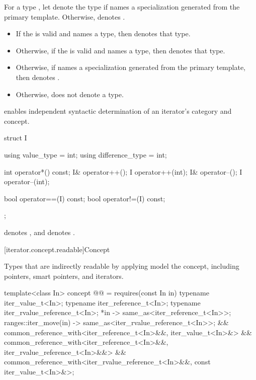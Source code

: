 \pnum
For a type , let  denote
the type  if  names
a specialization generated from the primary template.
Otherwise,  denotes
.
\begin{itemize}
\item If the 
   is valid
  and names a type, then  denotes that
  type.
\item Otherwise, if the 
  is valid and names a type, then 
  denotes that type.
\item Otherwise, if  names a specialization generated
  from the primary template, then 
  denotes .
\item Otherwise,  does not denote a type.
\end{itemize}

\pnum
\begin{note}
 enables independent syntactic determination
of an iterator's category and concept.
\end{note}
\begin{example}
\begin{codeblock}
struct I {
  using value_type = int;
  using difference_type = int;

  int operator*() const;
  I& operator++();
  I operator++(int);
  I& operator--();
  I operator--(int);

  bool operator==(I) const;
  bool operator!=(I) const;
};
\end{codeblock}
 denotes ,
and  denotes .
\end{example}

[iterator.concept.readable]{Concept }

\pnum
Types that are indirectly readable by applying 
model the  concept, including
pointers, smart pointers, and iterators.

\begin{codeblock}
template<class In>
  concept @@ =
    requires(const In in) {
      typename iter_value_t<In>;
      typename iter_reference_t<In>;
      typename iter_rvalue_reference_t<In>;
      { *in } -> same_as<iter_reference_t<In>>;
      { ranges::iter_move(in) } -> same_as<iter_rvalue_reference_t<In>>;
    } &&
    common_reference_with<iter_reference_t<In>&&, iter_value_t<In>&> &&
    common_reference_with<iter_reference_t<In>&&, iter_rvalue_reference_t<In>&&> &&
    common_reference_with<iter_rvalue_reference_t<In>&&, const iter_value_t<In>&>;
\end{codeblock}

